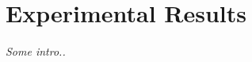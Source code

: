 \setlength{\footskip}{8mm}

\chapter{Experimental Results}
\label{ch:results}

\textit{Some intro..}


\FloatBarrier

